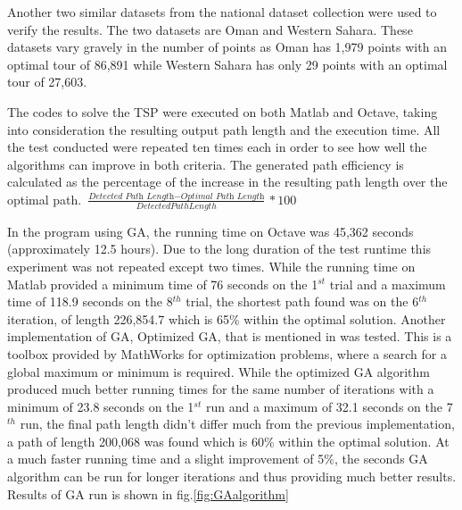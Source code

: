 \documentclass[twocolumn]{article}
\begin{document}
	Another two similar datasets from the national dataset collection were used to verify the results. The two datasets are Oman and Western Sahara. These datasets vary gravely in the number of points as Oman has 1,979 points with an optimal tour of 86,891 while Western Sahara has only 29 points with an optimal tour of 27,603. 
	
	The codes to solve the TSP\cite{Kirk14}\cite{mathwork}\cite{Jang02}\cite{Jevtic14}\cite{Ibrahim15} were executed on both Matlab and Octave, taking into consideration the resulting output path length and the execution time. All the test conducted were repeated ten times each in order to see how well the algorithms can improve in both criteria. The generated path efficiency is calculated as the percentage of the increase in the resulting path length over the optimal path.
	$\frac{\textit{Detected Path Length} - \textit{Optimal Path Length}}{Detected Path Length} * 100 $
	
	In the program using GA, the running time on Octave was 45,362 seconds (approximately 12.5 hours). Due to the long duration of the test runtime this experiment was not repeated except two times. While the running time on Matlab provided a minimum time of 76 seconds on the 1$^{st}$ trial and a maximum time of 118.9 seconds on the 8$^{th}$ trial, the shortest path found was on the 6$^{th}$ iteration, of length 226,854.7 which is 65\% within the optimal solution. Another implementation of GA, Optimized GA, that is mentioned in \cite{mathwork} was tested. This is a toolbox provided by MathWorks for optimization problems, where a search for a global maximum or minimum is required.  While the optimized GA algorithm produced much better running times for the same number of iterations with a minimum of 23.8 seconds on the 1$^{st}$ run and a maximum of 32.1 seconds on the 7$^{th}$ run, the final path length didn't differ much from the previous implementation, a path of length 200,068 was found which is 60\% within the optimal solution. At a much faster running time and a slight improvement of 5\%, the seconds GA algorithm can be run for longer iterations and thus providing much better results. Results of GA run is shown in fig.\ref{fig:GAalgorithm}
	
\end{document}

